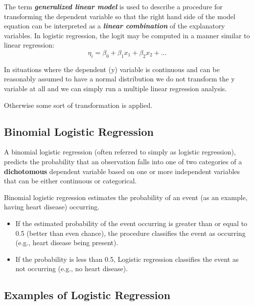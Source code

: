 \documentclass[a4paper,12pt]{article}
\begin{document}
The term \textbf{\textit{generalized linear model}} is used to describe a procedure for
transforming the dependent variable so that the right hand side of the model
equation can be interpreted as a \textbf{\textit{linear combination}} of the explanatory variables. 	In logistic regression, the logit may be computed in a manner similar to linear regression:
\[ \eta_i = \beta_0 + \beta_1x_1 + \beta_2x_2 + \ldots  \]

In situations where the dependent (y) variable is continuous and can be
reasonably assumed to have a normal distribution we do not transform the y
variable at all and we can simply run a multiple linear regression analysis.

Otherwise some sort of transformation is applied.


\subsection{Binomial Logistic Regression} 
A binomial logistic regression (often referred to simply as logistic regression), predicts the probability that an observation falls into one of two categories of a \textbf{dichotomous} dependent variable based on one or more independent variables that can be either continuous or categorical.

Binomial logistic regression estimates the probability of an event (as an example, having heart disease) occurring. 
\begin{itemize}
	\item If the estimated probability of the event occurring is greater than or equal to 0.5 (better than even chance), the procedure classifies the event as occurring (e.g., heart disease being present). \item If the probability is less than 0.5, Logistic regression classifies the event as not occurring (e.g., no heart disease). 
\end{itemize}

\subsection{Examples of Logistic Regression}
\end{document}
